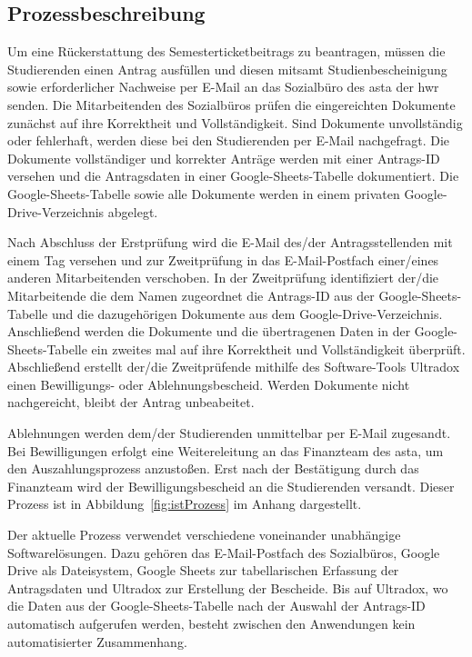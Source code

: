 \subsection{Prozessbeschreibung}\label{sec:Prozessbeschreibung}
Um eine Rückerstattung des Semesterticketbeitrags zu beantragen, müssen die Studierenden einen Antrag ausfüllen und diesen mitsamt Studienbescheinigung sowie erforderlicher Nachweise per E-Mail an das Sozialbüro des \gls{asta} der \gls{hwr} senden. Die Mitarbeitenden des Sozialbüros prüfen die eingereichten Dokumente zunächst auf ihre Korrektheit und Vollständigkeit. Sind Dokumente unvollständig oder fehlerhaft, werden diese bei den Studierenden per E-Mail nachgefragt. Die Dokumente vollständiger und korrekter Anträge werden mit einer Antrags-ID versehen und die Antragsdaten in einer Google-Sheets-Tabelle dokumentiert. Die Google-Sheets-Tabelle sowie alle Dokumente werden in einem privaten Google-Drive-Verzeichnis abgelegt. 

Nach Abschluss der Erstprüfung wird die E-Mail des/der Antragsstellenden mit einem Tag versehen und zur Zweitprüfung in das E-Mail-Postfach einer/eines anderen Mitarbeitenden verschoben. In der Zweitprüfung identifiziert der/die Mitarbeitende die dem Namen zugeordnet die Antrags-ID aus der Google-Sheets-Tabelle und die dazugehörigen Dokumente aus dem Google-Drive-Verzeichnis. Anschließend werden die Dokumente und die übertragenen Daten in der Google-Sheets-Tabelle ein zweites mal auf ihre Korrektheit und Vollständigkeit überprüft. Abschließend erstellt der/die Zweitprüfende mithilfe des Software-Tools Ultradox einen Bewilligungs- oder Ablehnungsbescheid. Werden Dokumente nicht nachgereicht, bleibt der Antrag unbeabeitet. 

Ablehnungen werden dem/der Studierenden unmittelbar per E-Mail zugesandt. Bei Bewilligungen erfolgt eine Weitereleitung an das Finanzteam des \gls{asta}, um den Auszahlungsprozess anzustoßen. Erst nach der Bestätigung durch das Finanzteam wird der Bewilligungsbescheid an die Studierenden versandt. Dieser Prozess ist in Abbildung~\ref{fig:istProzess} im Anhang dargestellt. 

Der aktuelle Prozess verwendet verschiedene voneinander unabhängige Softwarelösungen. Dazu gehören das E-Mail-Postfach des Sozialbüros, Google Drive als Dateisystem, Google Sheets zur tabellarischen Erfassung der Antragsdaten und Ultradox zur Erstellung der Bescheide. Bis auf Ultradox, wo die Daten aus der Google-Sheets-Tabelle nach der Auswahl der Antrags-ID automatisch aufgerufen werden, besteht zwischen den Anwendungen kein automatisierter Zusammenhang.

